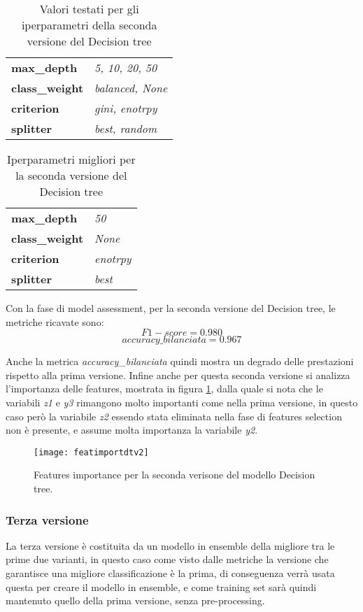 \begin{table}[h] 
\centering
\begin{tabular}{l l}
\hline
\textbf{max\_depth} & \textit{5, 10, 20, 50}\\
\textbf{class\_weight} & \textit{balanced, None}\\
\textbf{criterion} & \textit{gini, enotrpy}\\
\textbf{splitter} & \textit{best, random}\\
\hline
\end{tabular}
\caption{Valori testati per gli iperparametri della seconda versione del Decision tree}
\label{tab:valdtv2}
\end{table}

\begin{table}[h] 
\centering
\begin{tabular}{l l}
\hline
\textbf{max\_depth} & \textit{50}\\
\textbf{class\_weight} & \textit{None}\\
\textbf{criterion} & \textit{enotrpy}\\
\textbf{splitter} & \textit{best}\\
\hline
\end{tabular}
\caption{Iperparametri migliori per la seconda versione del Decision tree}
\label{tab:dtv2}
\end{table}

Con la fase di model assessment, per la seconda versione del Decision tree, le metriche ricavate sono:
$$F1-score = 0.980$$
$$accuracy\_bilanciata = 0.967$$

Anche la metrica \textit{accuracy\_bilanciata} quindi mostra un degrado delle prestazioni rispetto alla prima versione.
Infine anche per questa seconda versione si analizza l'importanza delle features, mostrata in figura \ref{fig:featuresimportancedtv2}, dalla quale si nota che le variabili \textit{z1} e \textit{y3} rimangono molto importanti come nella prima versione, in questo caso però la variabile \textit{z2} essendo stata eliminata nella fase di features selection non è presente, e assume molta importanza la variabile \textit{y2}.

\begin{figure}[h]
    \centering\texttt{[image: featimportdtv2]}
    \caption{Features importance per la seconda verisone del modello Decision tree.}
    \label{fig:featuresimportancedtv2}
\end{figure}

\subsubsection{Terza versione}
La terza versione è costituita da un modello in ensemble della migliore tra le prime due varianti, in questo caso come visto dalle metriche la versione che garantisce una migliore classificazione è la prima, di conseguenza verrà usata questa per creare il modello in ensemble, e come training set sarà quindi mantenuto quello della prima versione, senza pre-processing.

